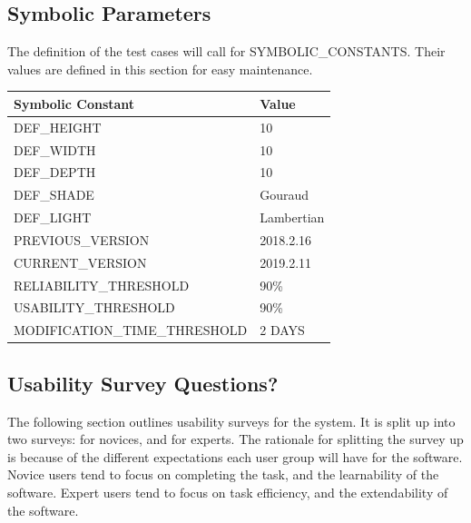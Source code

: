 \documentclass[12pt, titlepage]{article}
\begin{document}
\subsection{Symbolic Parameters}
The definition of the test cases will call for SYMBOLIC\_CONSTANTS.
Their values are defined in this section for easy maintenance.

\begin{tabular}{p{10cm}|p{5cm}}
	\textbf{Symbolic Constant} & \textbf{Value} \\
	\hline
	DEF\_HEIGHT & 10 \\
	DEF\_WIDTH & 10 \\
	DEF\_DEPTH & 10 \\
	DEF\_SHADE & Gouraud \\
	DEF\_LIGHT & Lambertian \\
	PREVIOUS\_VERSION & 2018.2.16 \\
	CURRENT\_VERSION & 2019.2.11\\
	RELIABILITY\_THRESHOLD & 90\%\\
	USABILITY\_THRESHOLD & 90\%\\
	MODIFICATION\_TIME\_THRESHOLD & 2 DAYS \\
\end{tabular}

\subsection{Usability Survey Questions?}
The following section outlines usability surveys for the system. It is split up 
into two surveys: for novices, and for experts. The rationale for splitting the 
survey up is because of the different expectations each user group will have 
for the software. Novice users tend to focus on completing the task, and the 
learnability of the software. Expert users tend to focus on task efficiency, 
and the extendability of the software.
\end{document}
